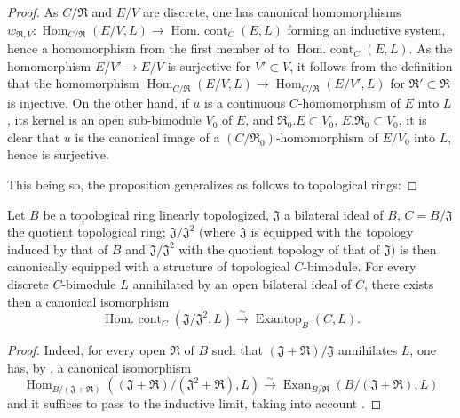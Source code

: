 \begin{proof}
As $C/\mathfrak{R}$ and $E/V$ are discrete, one has canonical homomorphisms $w_{\mathfrak{R},V}:\operatorname{Hom}_{C/\mathfrak{R}}(E/V,L)\to\operatorname{Hom.\ cont}_C(E,L)$ forming an inductive system, hence a homomorphism from the first member of  to $\operatorname{Hom.\ cont}_C(E,L)$.
As the homomorphism $E/V'\to E/V$ is surjective for $V'\subset V$, it follows from the definition that the homomorphism $\operatorname{Hom}_{C/\mathfrak{R}}(E/V,L)\to\operatorname{Hom}_{C/\mathfrak{R}}(E/V',L)$ for $\mathfrak{R}'\subset\mathfrak{R}$ is injective.
On the other hand, if $u$ is a continuous $C$-homomorphism of $E$ into $L$, its kernel is an open sub-bimodule $V_0$ of $E$, and $\mathfrak{R}_0.E\subset V_0$, $E.\mathfrak{R}_0\subset V_0$, it is clear that $u$ is the canonical image of a $(C/\mathfrak{R}_0)$-homomorphism of $E/V_0$ into $L$, hence  is surjective.

This being so, the proposition  generalizes as follows to topological rings:
\end{proof}

\begin{proposition}[18.5.4]
\label{0.18.5.4}
Let $B$ be a topological ring linearly topologized, $\mathfrak{J}$ a bilateral ideal of $B$, $C=B/\mathfrak{J}$ the quotient topological ring; $\mathfrak{J}/\mathfrak{J}^2$ \textup{(}where $\mathfrak{J}$ is equipped with the topology induced by that of $B$ and $\mathfrak{J}/\mathfrak{J}^2$ with the quotient topology of that of $\mathfrak{J}$\textup{)} is then canonically equipped with a structure of topological $C$-bimodule.
For every discrete $C$-bimodule $L$ annihilated by an open bilateral ideal of $C$, there exists then a canonical isomorphism
\begin{equation}
\tag{18.5.4.1}
  \label{0.18.5.4.1}
  \operatorname{Hom.\ cont}_C(\mathfrak{J}/\mathfrak{J}^2,L)\xrightarrow{\sim}\operatorname{Exantop}_B(C,L).
\end{equation}
\end{proposition}

\begin{proof}
Indeed, for every open $\mathfrak{R}$ of $B$ such that $(\mathfrak{J}+\mathfrak{R})/\mathfrak{J}$ annihilates $L$, one has, by , a canonical isomorphism
\[
  \operatorname{Hom}_{B/(\mathfrak{J}+\mathfrak{R})}((\mathfrak{J}+\mathfrak{R})/(\mathfrak{J}^2+\mathfrak{R}),L)\xrightarrow{\sim}\operatorname{Exan}_{B/\mathfrak{R}}(B/(\mathfrak{J}+\mathfrak{R}),L)
\]
and it suffices to pass to the inductive limit, taking into account .
\end{proof}
